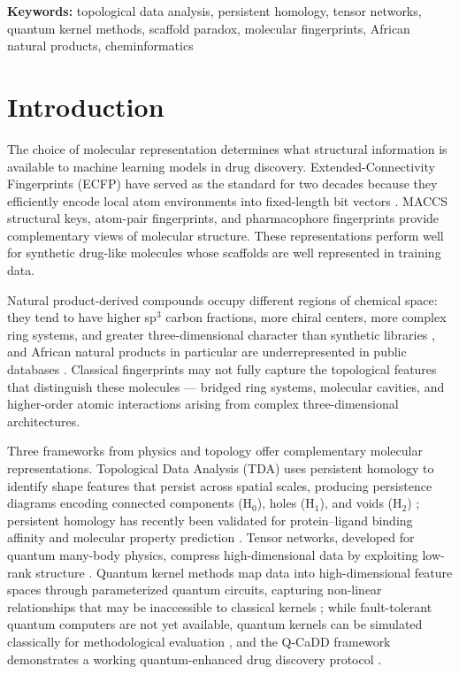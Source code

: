 \documentclass[11pt,a4paper]{article}
\begin{document}
\noindent\textbf{Keywords:} topological data analysis, persistent homology, tensor networks, quantum kernel methods, scaffold paradox, molecular fingerprints, African natural products, cheminformatics


\section{Introduction}

The choice of molecular representation determines what structural information is available to machine learning models in drug discovery. Extended-Connectivity Fingerprints (ECFP) have served as the standard for two decades because they efficiently encode local atom environments into fixed-length bit vectors \citep{ecfp_2010}. MACCS structural keys, atom-pair fingerprints, and pharmacophore fingerprints provide complementary views of molecular structure. These representations perform well for synthetic drug-like molecules whose scaffolds are well represented in training data.

Natural product-derived compounds occupy different regions of chemical space: they tend to have higher sp$^3$ carbon fractions, more chiral centers, more complex ring systems, and greater three-dimensional character than synthetic libraries \citep{coconut_2021}, and African natural products in particular are underrepresented in public databases \citep{anpdb_2026,value_addition_african_np_2025}. Classical fingerprints may not fully capture the topological features that distinguish these molecules --- bridged ring systems, molecular cavities, and higher-order atomic interactions arising from complex three-dimensional architectures.

Three frameworks from physics and topology offer complementary molecular representations. Topological Data Analysis (TDA) uses persistent homology to identify shape features that persist across spatial scales, producing persistence diagrams encoding connected components (H$_0$), holes (H$_1$), and voids (H$_2$) \citep{tda_review_2025}; persistent homology has recently been validated for protein--ligand binding affinity \citep{tda_binding_affinity_2026} and molecular property prediction \citep{tda_pretraining_2026}. Tensor networks, developed for quantum many-body physics, compress high-dimensional data by exploiting low-rank structure \citep{tensornet_2023,tn_efficient_2026}. Quantum kernel methods map data into high-dimensional feature spaces through parameterized quantum circuits, capturing non-linear relationships that may be inaccessible to classical kernels \citep{qml_review_2026}; while fault-tolerant quantum computers are not yet available, quantum kernels can be simulated classically for methodological evaluation \citep{pqc_chemistry_2026}, and the Q-CaDD framework demonstrates a working quantum-enhanced drug discovery protocol \citep{q_cadd_2026}.
\end{document}

